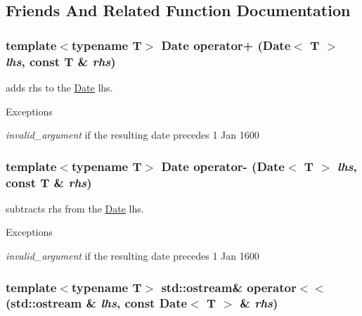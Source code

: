 \subsection{Friends And Related Function Documentation}
\hypertarget{classDate_a19ca6a1abad55481ddcf29a3e02d97cc}{
\subsubsection[{operator+}]{\setlength{\rightskip}{0pt plus 5cm}template$<$typename T$>$ {\bf Date} operator+ ({\bf Date}$<$ T $>$ {\em lhs}, \/  const T \& {\em rhs})}}
\label{classDate_a19ca6a1abad55481ddcf29a3e02d97cc}
adds rhs to the \hyperlink{classDate}{Date} lhs. 
\begin{DoxyExceptions}{Exceptions}
\item[{\em invalid\_\-argument}]if the resulting date precedes 1 Jan 1600 \end{DoxyExceptions}
\hypertarget{classDate_a4aa0e233f0db5fb3a64bbf90e3790a74}{
\subsubsection[{operator-\/}]{\setlength{\rightskip}{0pt plus 5cm}template$<$typename T$>$ {\bf Date} operator-\/ ({\bf Date}$<$ T $>$ {\em lhs}, \/  const T \& {\em rhs})}}
\label{classDate_a4aa0e233f0db5fb3a64bbf90e3790a74}
subtracts rhs from the \hyperlink{classDate}{Date} lhs. 
\begin{DoxyExceptions}{Exceptions}
\item[{\em invalid\_\-argument}]if the resulting date precedes 1 Jan 1600 \end{DoxyExceptions}
\hypertarget{classDate_ab955963105d77485237321ecadaec058}{
\subsubsection[{operator$<$$<$}]{\setlength{\rightskip}{0pt plus 5cm}template$<$typename T$>$ std::ostream\& operator$<$$<$ (std::ostream \& {\em lhs}, \/  const {\bf Date}$<$ T $>$ \& {\em rhs})}}
\label{classDate_ab955963105d77485237321ecadaec058}

